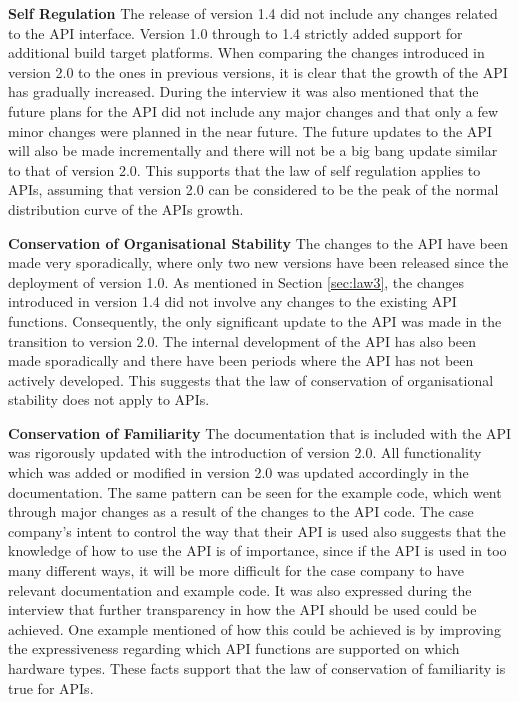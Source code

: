 \documentclass{sig-alternate}
\begin{document}
\smallskip \noindent
\textbf{Self Regulation} \label{sec:law3} 
The release of version 1.4 did not include any changes related to the API interface. Version 1.0 through to 1.4 strictly added support for additional build target platforms. When comparing the changes introduced in version 2.0 to the ones in previous versions, it is clear that the growth of the API has gradually increased. During the interview it was also mentioned that the future plans for the API did not include any major changes and that only a few minor changes were planned in the near future. The future updates to the API will also be made incrementally and there will not be a big bang update similar to that of version 2.0. This supports that the law of self regulation applies to APIs, assuming that version 2.0 can be considered to be the peak of the normal distribution curve of the APIs growth. 

\smallskip \noindent
\textbf{Conservation of Organisational Stability} 
The changes to the API have been made very sporadically, where only two new versions have been released since the deployment of version 1.0. As mentioned in Section \ref{sec:law3}, the changes introduced in version 1.4 did not involve any changes to the existing API functions. Consequently, the only significant update to the API was made in the transition to version 2.0. The internal development of the API has also been made sporadically and there have been periods where the API has not been actively developed. This suggests that the law of conservation of organisational stability does not apply to APIs. 

\smallskip \noindent
\textbf{Conservation of Familiarity} 
The documentation that is included with the API was rigorously updated with the introduction of version 2.0. All functionality which was added or modified in version 2.0 was updated accordingly in the documentation. The same pattern can be seen for the example code, which went through major changes as a result of the changes to the API code. The case company's intent to control the way that their API is used also suggests that the knowledge of how to use the API is of importance, since if the API is used in too many different ways, it will be more difficult for the case company to have relevant documentation and example code. It was also expressed during the interview that further transparency in how the API should be used could be achieved. One example mentioned of how this could be achieved is by improving the expressiveness regarding which API functions are supported on which hardware types. These facts support that the law of conservation of familiarity is true for APIs. 
\end{document}
